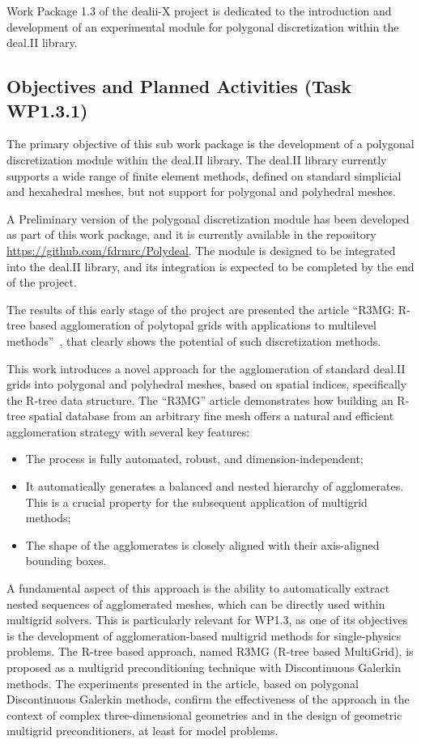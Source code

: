 \documentclass[a4paper,12pt]{article}
\begin{document}
Work Package 1.3 of the dealii-X project is dedicated to the introduction and
development of an experimental module for polygonal discretization within the
deal.II library. 

\subsection{Objectives and Planned Activities (Task WP1.3.1)}

The primary objective of this sub work package is the development of a polygonal
discretization module within the deal.II library. The deal.II library currently
supports a wide range of finite element methods, defined on standard simplicial
and hexahedral meshes, but not support for polygonal and polyhedral meshes.

A Preliminary version of the polygonal discretization module has been developed
as part of this work package, and it is currently available in the repository
\url{https://github.com/fdrmrc/Polydeal}. The module is designed to be
integrated into the deal.II library, and its integration is expected to be
completed by the end of the project.

The results of this early stage of the project are presented the article ``R3MG:
R-tree based agglomeration of polytopal grids with applications to multilevel
methods''~\cite{FederEtAl2025}, that clearly shows the potential of such
discretization methods. 

This work introduces a novel approach for the agglomeration of standard deal.II
grids into polygonal and polyhedral meshes, based on spatial indices,
specifically the R-tree data structure. The ``R3MG'' article demonstrates how
building an R-tree spatial database from an arbitrary fine mesh offers a natural
and efficient agglomeration strategy with several key features: 

\begin{itemize}
    \item 
    The process is fully automated, robust, and dimension-independent;
    \item It automatically generates a
balanced and nested hierarchy of agglomerates. This is a crucial property for
the subsequent application of multigrid methods;
\item The shape of the agglomerates
is closely aligned with their axis-aligned bounding boxes. 
\end{itemize}

A fundamental aspect of this approach is the ability to automatically extract
nested sequences of agglomerated meshes, which can be directly used within
multigrid solvers. This is particularly relevant for WP1.3, as one of its
objectives is the development of agglomeration-based multigrid methods for
single-physics problems. The R-tree based approach, named R3MG (R-tree based
MultiGrid), is proposed as a multigrid preconditioning technique with
Discontinuous Galerkin methods. The experiments presented in the article, based
on polygonal Discontinuous Galerkin methods, confirm the effectiveness of the
approach in the context of complex three-dimensional geometries and in the
design of geometric multigrid preconditioners, at least for model problems.
\end{document}
